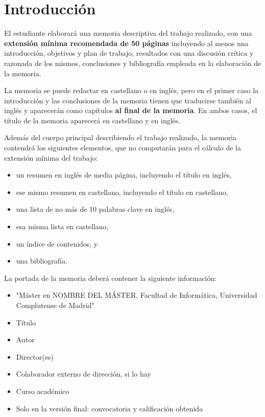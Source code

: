 \chapter{Introducción}
\label{cap:introduccion}



El estudiante elaborará una memoria descriptiva del trabajo realizado, con una \textbf{extensión mínima recomendada de 50 páginas} incluyendo al menos una introducción, objetivos y plan de trabajo, resultados con una discusión crítica y razonada de los mismos, conclusiones y bibliografía empleada en la elaboración de la memoria.

La memoria se puede redactar en castellano o en inglés, pero en el primer caso la introducción y las conclusiones de la memoria tienen que traducirse también al inglés y aparecerán como capítulos \textbf{al final de la memoria}. En ambos casos, el título de la memoria aparecerá en castellano y en inglés.

Además del cuerpo principal describiendo el trabajo realizado, la memoria contendrá los siguientes elementos, que no computarán para el cálculo de la extensión mínima del trabajo:

\begin{itemize}
\item un resumen en inglés de media página, incluyendo el título en inglés,
\item ese mismo resumen en castellano, incluyendo el título en castellano,
\item una lista de no más de 10 palabras clave en inglés,
\item esa misma lista en castellano,
\item un índice de contenidos, y
\item una bibliografía.
\end{itemize}

La portada de la memoria deberá contener la siguiente información:

\begin{itemize}
\item "Máster en NOMBRE DEL MÁSTER, Facultad de Informática, Universidad Complutense de Madrid"
\item Título
\item Autor
\item Director(es)
\item Colaborador externo de dirección, si lo hay
\item Curso académico
\item Solo en la versión final: convocatoria y calificación obtenida
\end{itemize}

